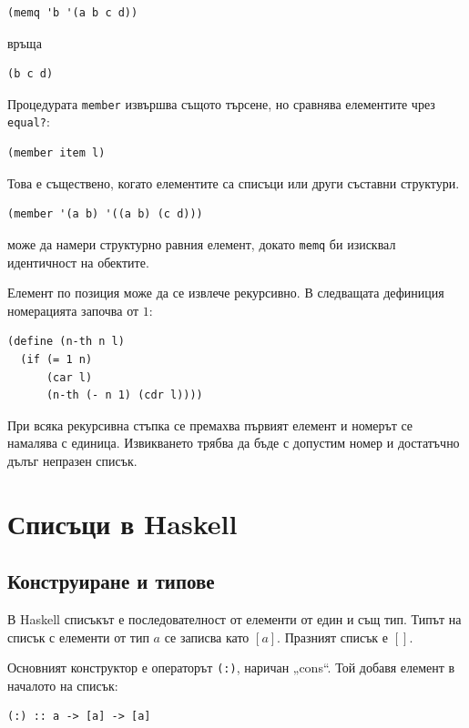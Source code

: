 \begin{verbatim}
(memq 'b '(a b c d))
\end{verbatim}

връща

\begin{verbatim}
(b c d)
\end{verbatim}

Процедурата \texttt{member} извършва същото търсене, но сравнява елементите чрез \texttt{equal?}:

\begin{verbatim}
(member item l)
\end{verbatim}

Това е съществено, когато елементите са списъци или други съставни структури.

\begin{verbatim}
(member '(a b) '((a b) (c d)))
\end{verbatim}

може да намери структурно равния елемент, докато \texttt{memq} би изисквал идентичност на обектите.

Елемент по позиция може да се извлече рекурсивно. В следващата дефиниция номерацията започва от $1$:

\begin{verbatim}
(define (n-th n l)
  (if (= 1 n)
      (car l)
      (n-th (- n 1) (cdr l))))
\end{verbatim}

При всяка рекурсивна стъпка се премахва първият елемент и номерът се намалява с единица. Извикването трябва да бъде с допустим номер и достатъчно дълъг непразен списък.

\section{Списъци в Haskell}\label{s:20.3}

\subsection{Конструиране и типове}\label{s:20.3.1}

В Haskell списъкът е последователност от елементи от един и същ тип. Типът на списък с елементи от тип $a$ се записва като $[a]$. Празният списък е $[]$.

Основният конструктор е операторът \texttt{(:)}, наричан „cons“. Той добавя елемент в началото на списък:

\begin{verbatim}
(:) :: a -> [a] -> [a]
\end{verbatim}

